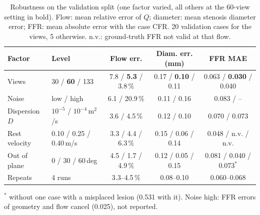 \begin{table}[t]
\centering
\small
\caption{Robustness on the validation split (one factor varied, all others
at the 60-view setting in bold). Flow: mean relative error of $Q$;
diameter: mean stenosis diameter error; FFR: mean absolute error with the
case CFR. 20 validation cases for the views, 5 otherwise.
n.v.: ground-truth FFR not valid at that flow.}
\label{tab:sweeps}
\begin{tabular}{llccc}
\toprule
Factor & Level & Flow err. & Diam. err. (mm) & FFR MAE \\
\midrule
Views & 30 / \textbf{60} / 133 & 7.8 / \textbf{5.3} / 3.8\,\% & 0.17 / \textbf{0.10} / 0.11 & 0.063 / \textbf{0.030} / 0.040 \\
Noise & low / high & 6.1 / 20.9\,\% & 0.11 / 0.16 & 0.083 / -- \\
Dispersion $D$ & $10^{-5}$ / $10^{-4}$\,m$^2$/s & 3.6 / 4.5\,\% & 0.12 / 0.10 & 0.070 / 0.073 \\
Rest velocity & 0.10 / 0.25 / 0.40\,m/s & 3.3 / 4.4 / 6.3\,\% & 0.15 / 0.06 / 0.14 & 0.048 / n.v. / n.v. \\
Out of plane & 0 / 30 / 60\,deg & 4.5 / 1.7 / 4.9\,\% & 0.12 / 0.05 / 0.15 & 0.081 / 0.040 / 0.073$^\ast$ \\
Repeats & 4 runs & 3.3--4.5\,\% & 0.08--0.10 & 0.060--0.068 \\
\bottomrule
\end{tabular}

\vspace{2pt}
{\footnotesize $^\ast$ without one case with a misplaced lesion (0.531 with it). Noise high: FFR errors of geometry and flow cancel (0.025), not reported.}
\end{table}
